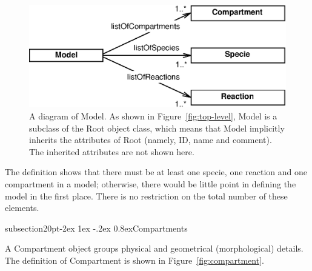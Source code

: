 \documentclass[10pt]{article}
\makeatletter
\renewcommand{\subsection}{\@startsection%
  {subsection}{2}{0pt}{-2ex \@plus 1ex \@minus -.2ex}%
  {0.8ex}{\slshape\large\bfseries}}
\newcommand{\class}[1]{\textsf{#1}}
\newcommand{\attrib}[1]{\textsf{#1}}
\makeatother
\begin{document}
\begin{figure}[tb]
  \centering
  \includegraphics[scale = 0.75]{model.eps}
  \caption{A diagram of \class{Model}.  As shown in
    Figure~\ref{fig:top-level}, \class{Model} is a subclass of the
    \class{Root} object class, which means that \class{Model} implicitly
    inherits the attributes of \class{Root} (namely, \attrib{ID},
    \attrib{name} and \attrib{comment}).  The inherited attributes are not
    shown here.}
  \label{fig:model}
\end{figure}

The definition shows that there must be at least one specie, one reaction
and one compartment in a model; otherwise, there would be little point in
defining the model in the first place.  There is no restriction on the
total number of these elements.




\subsection{Compartments}

A \class{Compartment} object groups physical and geometrical
(morphological) details.  The definition of \class{Compartment} is shown in
Figure~\ref{fig:compartment}.
\end{document}
